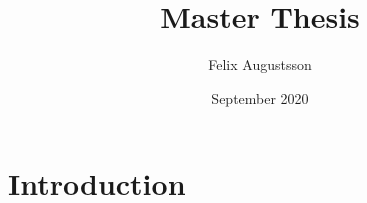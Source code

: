 \documentclass{article}
\title{Master Thesis}
\author{Felix Augustsson}
\date{September 2020}
\begin{document}
\maketitle

\section{Introduction}
\end{document}
